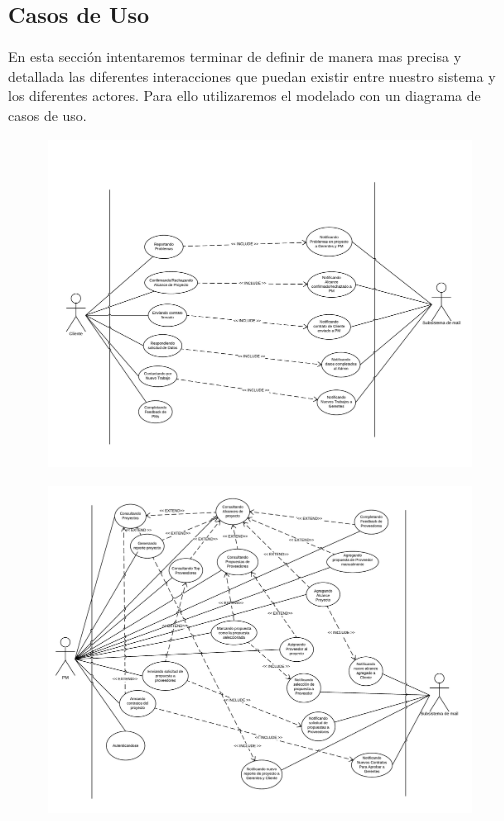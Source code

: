 \subsection{Casos de Uso}

En esta sección intentaremos terminar de definir de manera mas precisa y detallada las diferentes interacciones que puedan existir entre nuestro sistema y los diferentes actores. Para ello utilizaremos el modelado con un diagrama de casos de uso.

\begin{figure}[H]
\includegraphics[width=\linewidth]{diag/viejos/cu1.pdf}
\end{figure}
\begin{figure}[H]
\includegraphics[width=\linewidth]{diag/viejos/cu2.pdf}
\end{figure}
